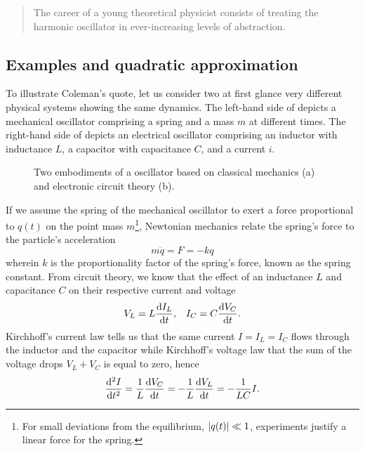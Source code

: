 \blockcquote{Sidney Coleman}{The career of a young theoretical physicist consists of treating the harmonic oscillator in ever-increasing levels of abstraction.}

\subsection{Examples and quadratic approximation}

To illustrate Coleman's quote, let us consider two at first glance very different physical systems showing the same dynamics.
The left-hand side of  depicts a mechanical oscillator comprising a spring and a mass $m$ at different times.
The right-hand side of  depicts an electrical oscillator comprising an inductor with inductance $L$, a capacitor with capacitance $C$, and a current $i$.
\begin{figure}[htb]
    \centering
    \qquad
    \caption{Two embodiments of a oscillator based on classical mechanics (a) and electronic circuit theory (b).}\label{fig:ho}
\end{figure}
If we assume the spring of the mechanical oscillator to exert a force proportional to $q(t)$ on the point mass $m$\footnote{For small deviations from the equilibrium, $\abs{q(t)}\ll1$, experiments justify a linear force for the spring.}, Newtonian mechanics relate the spring's force to the particle's acceleration
\begin{equation}
    m\ddot{q}
    =
    F
    =
    -kq
    \label{eq:ho_newton}
\end{equation}
wherein $k$ is the proportionality factor of the spring's force, known as the spring constant.
From circuit theory, we know that the effect of an inductance $L$ and capacitance $C$ on their respective current and voltage
\begin{align}
    V_L
    =
    L\dv{I_L}{t}
    ,&&
    I_C
    =
    C\dv{V_C}{t}
    .
\end{align}
Kirchhoff's current law tells us that the same current $I=I_L=I_C$ flows through the inductor and the capacitor while Kirchhoff's voltage law that the sum of the voltage drops $V_L+V_C$ is equal to zero, hence
\begin{equation}
    \dv[2]{I}{t}
    =
    \frac{1}{L}\dv{V_C}{t}
    =
    -\frac{1}{L}\dv{V_L}{t}
    =
    -\frac{1}{LC}I
    \label{eq:ho_current}.
\end{equation}
